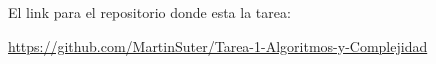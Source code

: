 El link para el repositorio donde esta la tarea:

\url{https://github.com/MartinSuter/Tarea-1-Algoritmos-y-Complejidad}
